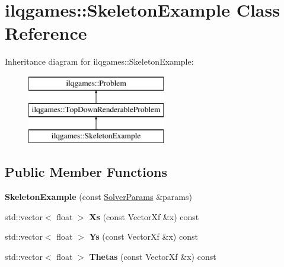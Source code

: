 \hypertarget{classilqgames_1_1_skeleton_example}{}\section{ilqgames\+:\+:Skeleton\+Example Class Reference}
\label{classilqgames_1_1_skeleton_example}
Inheritance diagram for ilqgames\+:\+:Skeleton\+Example\+:\begin{figure}[H]
\begin{center}
\leavevmode
\includegraphics[height=3.000000cm]{classilqgames_1_1_skeleton_example}
\end{center}
\end{figure}
\subsection*{Public Member Functions}
\begin{DoxyCompactItemize}
\item 
{\bfseries Skeleton\+Example} (const \hyperlink{structilqgames_1_1_solver_params}{Solver\+Params} \&params)\hypertarget{classilqgames_1_1_skeleton_example_ad1700a16c9e56f80ca2e5ada926ccf72}{}\label{classilqgames_1_1_skeleton_example_ad1700a16c9e56f80ca2e5ada926ccf72}

\item 
std\+::vector$<$ float $>$ {\bfseries Xs} (const Vector\+Xf \&x) const \hypertarget{classilqgames_1_1_skeleton_example_ae0e9ad0a27e485e28e9ca3728df72470}{}\label{classilqgames_1_1_skeleton_example_ae0e9ad0a27e485e28e9ca3728df72470}

\item 
std\+::vector$<$ float $>$ {\bfseries Ys} (const Vector\+Xf \&x) const \hypertarget{classilqgames_1_1_skeleton_example_a09b34bb53952b9d151d61e94e8471fe4}{}\label{classilqgames_1_1_skeleton_example_a09b34bb53952b9d151d61e94e8471fe4}

\item 
std\+::vector$<$ float $>$ {\bfseries Thetas} (const Vector\+Xf \&x) const \hypertarget{classilqgames_1_1_skeleton_example_a3f62282748531798d1f821d8e937f2c6}{}\label{classilqgames_1_1_skeleton_example_a3f62282748531798d1f821d8e937f2c6}

\end{DoxyCompactItemize}
